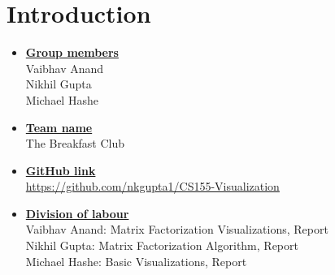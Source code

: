 \newif\ifshowsolutions
\showsolutionstrue

\newcommand{\boldline}[1]{\underline{\textbf{#1}}}


\usepackage{amsfonts} %
\usepackage{amsmath} %
\usepackage{longtable} %
\usepackage{enumitem}
\usepackage{graphicx} %
\graphicspath{{../graphics/}} %
\usepackage{makecell}
\usepackage[margin=2.25cm]{caption}
\setlength{\parindent}{20pt}
\usepackage[toc,page]{appendix}
\usepackage[font=small,labelfont=bf]{caption}
\usepackage{subfig}


\pagestyle{fancy}

\section{Introduction}
\medskip
\begin{itemize}

    \item \boldline{Group members} \\
    Vaibhav Anand \\
    Nikhil Gupta \\
    Michael Hashe
    
    \item \boldline{Team name} \\
    The Breakfast Club

    \item \boldline{GitHub link} \\
    \href{https://github.com/nkgupta1/CS155-Visualization}{https://github.com/nkgupta1/CS155-Visualization}
    
    \item \boldline{Division of labour} \\
    Vaibhav Anand: Matrix Factorization Visualizations, Report\\
    Nikhil Gupta: Matrix Factorization Algorithm, Report \\
    Michael Hashe: Basic Visualizations, Report

\end{itemize}


